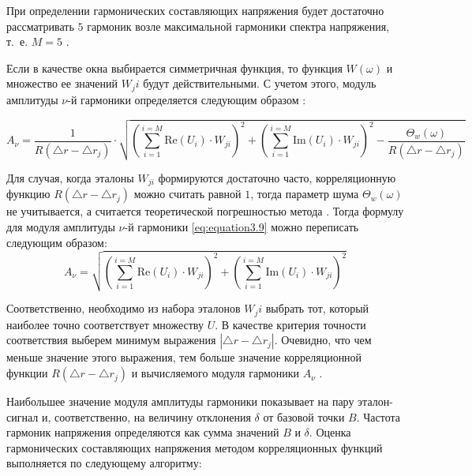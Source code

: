 При определении гармонических составляющих напряжения будет достаточно рассматривать $5$ гармоник возле максимальной гармоники спектра напряжения, т.~е. $M = 5$ \cite{Increase_Accuracy_Yelizarov2014}.

Если в качестве окна выбирается симметричная функция, то функция $W(\omega)$  и множество ее значений $W_ji$  будут действительными. С учетом этого, модуль амплитуды  $\nu$-й гармоники определяется следующим образом \cite{Increase_Accuracy_Yelizarov2014}:

\begin{equation}
	\label{eq:equation3.9}
	A_{\nu} = \frac{1}{R(\bigtriangleup r - \bigtriangleup r_j)} \cdot \sqrt{\left({\displaystyle\sum_{i=1}^{i=M}\mathrm{Re}(U_i) \cdot W_{ji}} \right)^2 + \left({\displaystyle\sum_{i=1}^{i=M}\mathrm{Im}(U_i) \cdot W_{ji}} \right)^2 - \frac{\Theta_w(\omega)}{R(\bigtriangleup r - \bigtriangleup r_j)}}
\end{equation}

Для случая, когда эталоны $W_{ji}$ формируются достаточно часто, корреляционную функцию $R(\bigtriangleup r - \bigtriangleup r_j) $  можно считать равной $1$, тогда параметр шума $\Theta_w(\omega)$ не учитывается, а считается теоретической погрешностью метода \cite{Increase_Accuracy_Yelizarov2014}. Тогда формулу для модуля амплитуды  $\nu$-й гармоники \ref{eq:equation3.9} можно переписать следующим образом:
\begin{equation}
	\label{eq:equation3.10}
	A_{\nu} =  \sqrt{\left({\displaystyle\sum_{i=1}^{i=M}\mathrm{Re}(U_i) \cdot W_{ji}} \right)^2 + \left({\displaystyle\sum_{i=1}^{i=M}\mathrm{Im}(U_i) \cdot W_{ji}} \right)^2}
\end{equation}

Соответственно, необходимо из набора  эталонов $W_ji$ выбрать тот, который наиболее точно соответствует множеству $U$. В качестве критерия точности соответствия выберем минимум выражения $ \left|{\bigtriangleup r - \bigtriangleup r_j}\right| $. Очевидно, что чем меньше значение этого выражения, тем больше значение корреляционной функции $R(\bigtriangleup r - \bigtriangleup r_j)$ и вычисляемого модуля гармоники $A_\nu$ \cite{Increase_Accuracy_Yelizarov2014}. 

Наибольшее значение модуля амплитуды гармоники показывает на пару эталон-сигнал и, соответственно, на величину отклонения $\delta$ от базовой точки $B$. Частота гармоник напряжения определяются как сумма значений $B$ и $\delta$.
Оценка гармонических составляющих напряжения методом корреляционных функций выполняется по следующему алгоритму:

